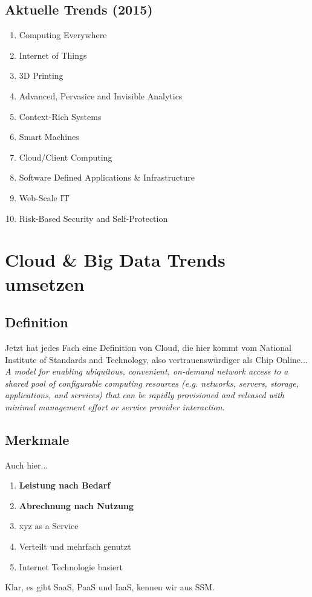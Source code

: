 \subsection{Aktuelle Trends (2015)}
\begin{enumerate}
	\item Computing Everywhere
	\item Internet of Things
	\item 3D Printing
	\item Advanced, Pervasice and Invisible Analytics
	\item Context-Rich Systems
	\item Smart Machines
	\item Cloud/Client Computing
	\item Software Defined Applications \& Infrastructure
	\item Web-Scale IT
	\item Risk-Based Security and Self-Protection
\end{enumerate}

\section{Cloud \& Big Data Trends umsetzen}
\subsection{Definition}
Jetzt hat jedes Fach eine Definition von Cloud, die hier kommt vom National Institute of Standards and Technology, also  vertrauenswürdiger als Chip Online...
\textit{A model for enabling ubiquitous, convenient, on-demand network access to a shared pool of configurable computing resources (e.g. networks, servers, storage, applications, and services) that can be rapidly provisioned and released with minimal management effort or service provider interaction.}
\subsection{Merkmale}
Auch hier...
\begin{enumerate}
	\item \textbf{Leistung nach Bedarf}
	\item \textbf{Abrechnung nach Nutzung}
	\item xyz as a Service
	\item Verteilt und mehrfach genutzt
	\item Internet Technologie basiert
\end{enumerate}
Klar, es gibt SaaS, PaaS und IaaS, kennen wir aus SSM.
